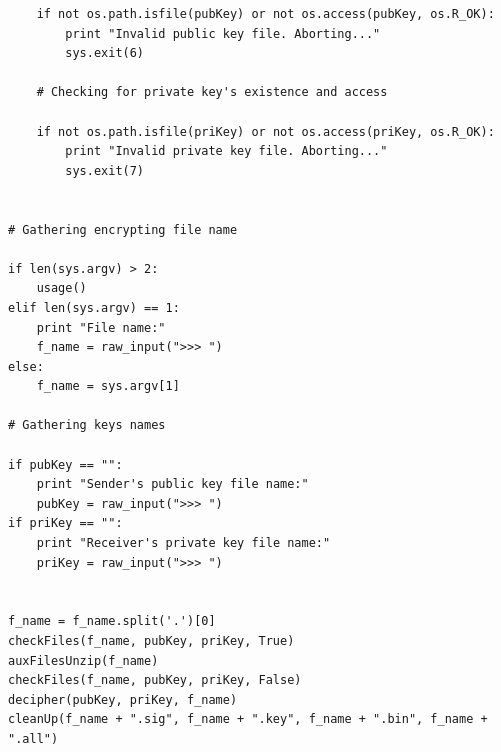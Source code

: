 \documentclass[a4paper,11pt,openright,oneside]{report}
\begin{document}
\begin{verbatim}
    if not os.path.isfile(pubKey) or not os.access(pubKey, os.R_OK):
        print "Invalid public key file. Aborting..."
        sys.exit(6)

    # Checking for private key's existence and access

    if not os.path.isfile(priKey) or not os.access(priKey, os.R_OK):
        print "Invalid private key file. Aborting..."
        sys.exit(7)


# Gathering encrypting file name

if len(sys.argv) > 2:
    usage()
elif len(sys.argv) == 1:
    print "File name:"
    f_name = raw_input(">>> ")
else:
    f_name = sys.argv[1]

# Gathering keys names

if pubKey == "":
    print "Sender's public key file name:"
    pubKey = raw_input(">>> ")
if priKey == "":
    print "Receiver's private key file name:"
    priKey = raw_input(">>> ")


f_name = f_name.split('.')[0]
checkFiles(f_name, pubKey, priKey, True)
auxFilesUnzip(f_name)
checkFiles(f_name, pubKey, priKey, False)
decipher(pubKey, priKey, f_name)
cleanUp(f_name + ".sig", f_name + ".key", f_name + ".bin", f_name + ".all")
\end{verbatim}

\maketitle
\nocite{*}
\printbibliography[title={Referências}]
\end{document}
